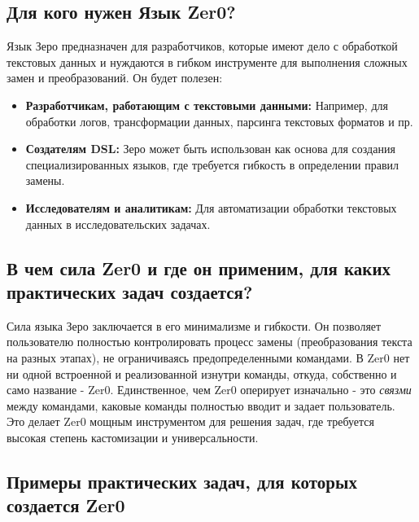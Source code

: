 \documentclass{book}
\begin{document}
\subsection{Для кого нужен Язык Zer0?}
Язык Зеро предназначен для разработчиков, которые имеют дело с обработкой текстовых данных и нуждаются в гибком инструменте для выполнения сложных замен и преобразований. Он будет полезен:


\begin{itemize}

\item \textbf{Разработчикам, работающим с текстовыми данными:} Например, для обработки логов, трансформации данных, парсинга текстовых форматов и пр.

\item \textbf{Создателям DSL:} Зеро может быть использован как основа для создания специализированных языков, где требуется гибкость в определении правил замены.

\item \textbf{Исследователям и аналитикам:} Для автоматизации обработки текстовых данных в исследовательских задачах.

\end{itemize}


\subsection{В чем сила Zer0 и где он применим, для каких практических задач создается?}

Сила языка Зеро заключается в его минимализме и гибкости. Он позволяет пользователю полностью контролировать процесс замены (преобразования текста на разных этапах), не ограничиваясь предопределенными командами. В Zer0 нет ни одной встроенной и реализованной изнутри команды, откуда, собственно и само название - Zer0. Единственное, чем Zer0 оперирует изначально - это \textit{связми} между командами, каковые команды полностью вводит и задает пользователь. Это делает Zer0 мощным инструментом для решения задач, где требуется высокая степень кастомизации и универсальности.

\subsection{Примеры практических задач, для которых создается Zer0}
\end{document}
